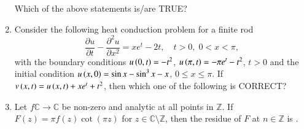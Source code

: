 \documentclass[journal,12pt,onecolumn]{IEEEtran}
\theoremstyle{remark}
\begin{document}
\begin{enumerate}[start=1, label=Q.\arabic*]
Which of the above statements is/are TRUE?
\begin{enumerate}
\end{enumerate}

\hfill{}


\item Consider the following heat conduction problem for a finite rod
\[
\frac{\partial u}{\partial t}-\frac{\partial^2 u}{\partial x^2}= x e^{t}-2t,\quad t>0,\; 0<x<\pi,
\]
with the boundary conditions $u\left(0,t\right)=-t^2$, $u\left(\pi,t\right)=-\pi e^{t}-t^2$, $t>0$ and the initial condition
$u\left(x,0\right)=\sin x - \sin^{3} x - x$, $0 \le x \le \pi$. If $v\left(x,t\right)=u\left(x,t\right)+x e^{t}+t^{2}$, then which one of the following is CORRECT?
\begin{enumerate}
\end{enumerate}

\hfill{}
\item Let $f \mathbb{C} \to \mathbb{C}$ be non-zero and analytic at all points in $\mathbb{Z}$.  
If $F(z)=\pi f(z)\cot(\pi z)$ for $z \in \mathbb{C}\setminus \mathbb{Z}$, then the residue of $F$ at $n \in \mathbb{Z}$ is \underline{\hspace{2cm}}.  


\begin{enumerate}
\end{enumerate}


\end{enumerate}
\end{document}

